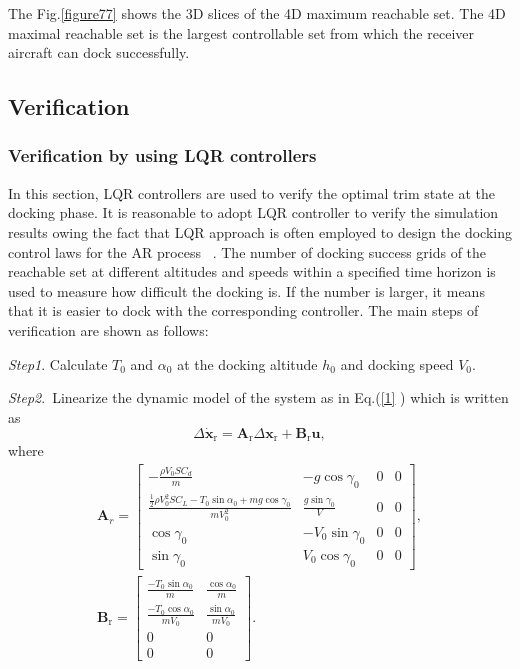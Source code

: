The Fig.\ref{figure77} shows the 3D slices of the 4D maximum reachable set.
The 4D maximal reachable set is the largest controllable set from which the
receiver aircraft can dock successfully.




\subsection{Verification}

\subsubsection{Verification by using LQR controllers}



In this section, LQR controllers are used to verify the optimal trim state
at the docking phase. It is reasonable to adopt LQR controller to verify the
simulation results owing the fact that LQR approach is often employed to
design the docking control laws for the AR process\ \cite{3} \cite{26} \cite{27}. The number of docking success grids of the reachable set at
different altitudes and speeds within a specified time horizon is used to
measure how difficult the docking is. If the number is larger, it means that
it is easier to dock with the corresponding controller. The main steps of
verification are shown as follows:



\textit{Step1}. Calculate $T_{0}$ and $\alpha_{0}$ at the docking altitude $%
h_{0}$ and docking speed $V_{0}$.

\textit{Step2}.\ Linearize the dynamic model of the system as in Eq.(\ref{1}%
) which is written as
\[
\Delta\mathbf{\dot{x}}_\text{r}=\mathbf{A}_\text{r}\Delta\mathbf{x}_\text{r}+\mathbf{B}_\text{r}\mathbf{u},
\]
where
\[
\begin{array}{c}
\mathbf{A}_{r}=\left[\begin{array}{cccc}
-\frac{\rho V_{0}SC_{d}}{m} & -g\cos\gamma_{0} & 0 & 0\\
\frac{\frac{1}{2}\rho V_{0}^{2}SC_{L}-T_{0}\sin\alpha_{0}+mg\cos\gamma_{0}}{mV_{0}^{2}} & \frac{g\sin\gamma_{0}}{V} & 0 & 0\\
\cos\gamma_{0} & -V_{0}\sin\gamma_{0} & 0 & 0\\
\sin\gamma_{0} & V_{0}\cos\gamma_{0} & 0 & 0
\end{array}\right],\\
\mathbf{B}_\text{r}=\left[\begin{array}{cc}
\frac{-T_{0}\sin\alpha_{0}}{m} & \frac{\cos\alpha_{0}}{m}\\
\frac{-T_{0}\cos\alpha_{0}}{mV_{0}} & \frac{\sin\alpha_{0}}{mV_{0}}\\
0 & 0\\
0 & 0
\end{array}\right].
\end{array}
\]

